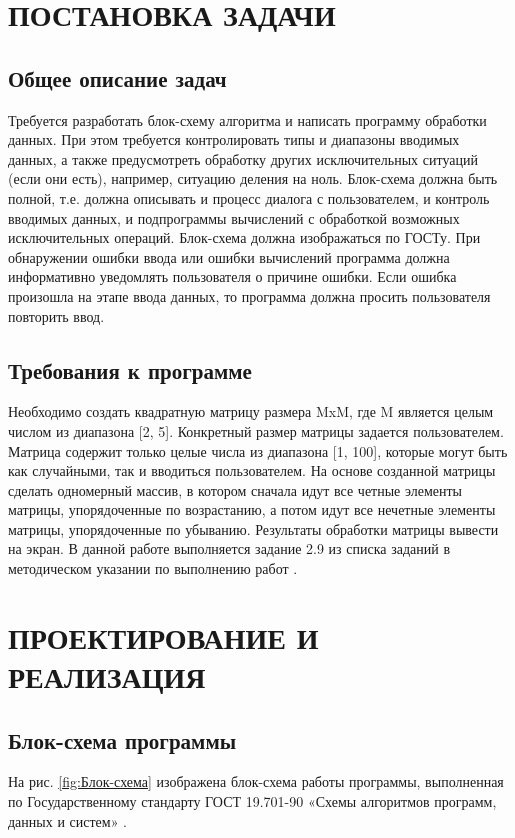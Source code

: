 \documentclass{mirea}
\author     {Краснов Н.O.}
\begin{document}
\chapter{ПОСТАНОВКА ЗАДАЧИ}
\section{Общее описание задач}
Требуется разработать блок-схему алгоритма и написать программу обработки данных. При этом требуется контролировать типы и диапазоны вводимых данных, а также предусмотреть обработку других исключительных ситуаций (если они есть), например, ситуацию деления на ноль. Блок-схема должна быть полной, т.е. должна описывать и процесс диалога с пользователем, и контроль вводимых данных, и подпрограммы вычислений с обработкой возможных исключительных операций. Блок-схема должна изображаться по ГОСТу. При обнаружении ошибки ввода или ошибки вычислений программа должна информативно уведомлять пользователя о причине ошибки. Если ошибка произошла на этапе ввода данных, то программа должна просить пользователя повторить ввод.

\section{Требования к программе}
Необходимо создать квадратную матрицу размера MxM, где M является целым числом из диапазона [2, 5]. Конкретный размер матрицы задается пользователем. Матрица содержит только целые числа из диапазона [1, 100], которые могут быть как случайными, так и вводиться пользователем. На основе созданной матрицы сделать одномерный массив, в котором сначала идут все четные элементы матрицы, упорядоченные по возрастанию, а потом идут все нечетные элементы матрицы, упорядоченные по убыванию. Результаты обработки матрицы вывести на экран.
В данной работе выполняется задание 2.9 из списка заданий в методическом указании по выполнению работ \cite[c 84]{Методичка}.

\chapter{ПРОЕКТИРОВАНИЕ И РЕАЛИЗАЦИЯ}
\section{Блок-схема программы}
На рис. \ref{fig:Блок-схема} изображена блок-схема работы программы, выполненная по Государственному стандарту ГОСТ 19.701-90 «Схемы алгоритмов программ, данных и систем» \cite{ГОСТ блок-схемы}.
\end{document}

